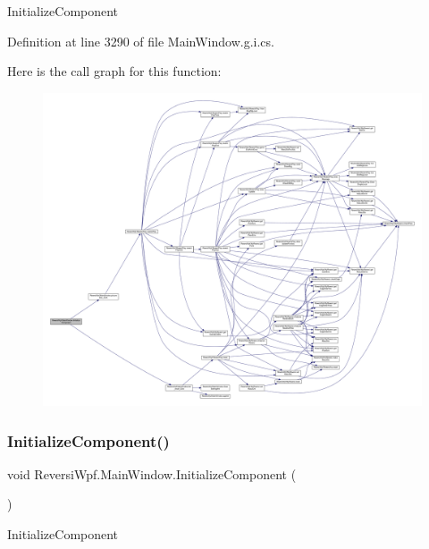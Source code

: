 Initialize\+Component 



Definition at line 3290 of file Main\+Window.\+g.\+i.\+cs.

Here is the call graph for this function\+:
\nopagebreak
\begin{figure}[H]
\begin{center}
\leavevmode
\includegraphics[width=350pt]{class_reversi_wpf_1_1_main_window_a4cf9bc92cee02fa8e3b00fa56fb41c82_cgraph}
\end{center}
\end{figure}
\mbox{\label{class_reversi_wpf_1_1_main_window_a4cf9bc92cee02fa8e3b00fa56fb41c82}} 
\subsubsection{\texorpdfstring{Initialize\+Component()}{InitializeComponent()}\hspace{0.1cm}{\footnotesize\ttfamily [3/4]}}
{\footnotesize\ttfamily void Reversi\+Wpf.\+Main\+Window.\+Initialize\+Component (\begin{DoxyParamCaption}{ }\end{DoxyParamCaption})}



Initialize\+Component 



